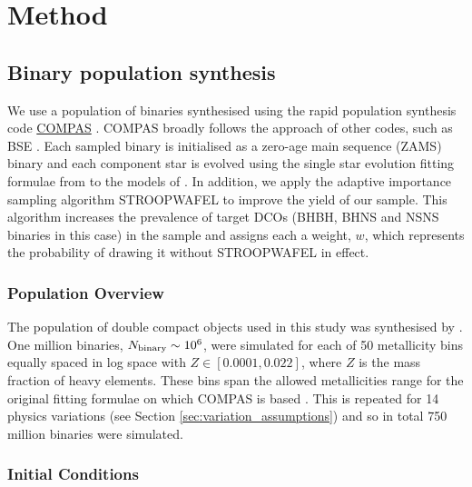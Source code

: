 \documentclass[twocolumn]{aastex63}
\begin{document}
\section{Method} \label{sec:method}
\subsection{Binary population synthesis}\label{sec:COMPAS_explained}

We use a population of binaries synthesised using the rapid population synthesis code \href{https://compas.science}{COMPAS} \citep{Stevenson+2017, Vigna-Gomez+2018, Stevenson+2019}. COMPAS broadly follows the approach of other codes, such as BSE \citep{Hurley+2002}. Each sampled binary is initialised as a zero-age main sequence (ZAMS) binary and each component star is evolved using the single star evolution fitting formulae from \citet{Hurley+2000} to the models of \citet{Pols+1998}. In addition, we apply the adaptive importance sampling algorithm STROOPWAFEL \citep{Broekgaarden+2019} to improve the yield of our sample. This algorithm increases the prevalence of target DCOs (BHBH, BHNS and NSNS binaries in this case) in the sample and assigns each a weight, $w$, which represents the probability of drawing it without STROOPWAFEL in effect.

\subsubsection{Population Overview}

The population of double compact objects used in this study was synthesised by \citet{Broekgaarden+2021}. One million binaries, $N_{\rm binary} \sim 10^6$, were simulated for each of 50 metallicity bins equally spaced in log space with $Z \in [0.0001, 0.022]$, where $Z$ is the mass fraction of heavy elements. These bins span the allowed metallicities range for the original fitting formulae on which COMPAS is based \citep{Hurley+2000}. This is repeated for 14 physics variations (see Section \ref{sec:variation_assumptions}) and so in total 750 million binaries were simulated.

\subsubsection{Initial Conditions}
\end{document}
